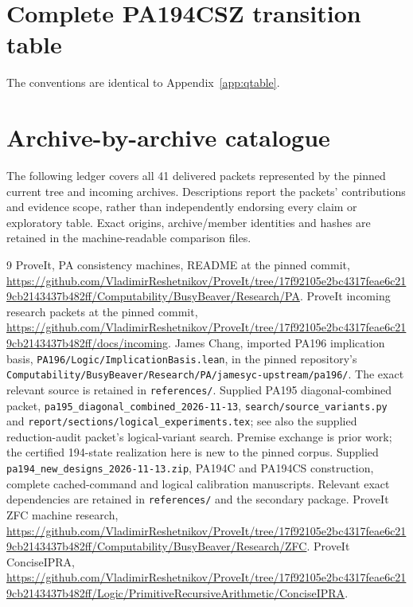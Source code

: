 \documentclass[11pt,letterpaper]{article}
\newcommand{\file}[1]{\texttt{\nolinkurl{#1}}}
\begin{document}
\clearpage
\section{Complete PA194CSZ transition table}\label{app:csztable}
The conventions are identical to Appendix~\ref{app:qtable}.


\clearpage
\section{Archive-by-archive catalogue}\label{app:ledger}
The following ledger covers all 41 delivered packets represented by the
pinned current tree and incoming archives. Descriptions report the packets'
contributions and evidence scope, rather than independently endorsing every
claim or exploratory table. Exact origins, archive/member identities and
hashes are retained in the machine-readable comparison files.


\begin{thebibliography}{9}
 ProveIt, PA consistency machines, README at the pinned
commit, \url{https://github.com/VladimirReshetnikov/ProveIt/tree/17f92105e2bc4317feae6c219cb2143437b482ff/Computability/BusyBeaver/Research/PA}.
 ProveIt incoming research packets at the pinned commit,
\url{https://github.com/VladimirReshetnikov/ProveIt/tree/17f92105e2bc4317feae6c219cb2143437b482ff/docs/incoming}.
 James Chang, imported PA196 implication basis,
\file{PA196/Logic/ImplicationBasis.lean}, in the pinned repository's
\file{Computability/BusyBeaver/Research/PA/jamesyc-upstream/pa196/}.
The exact relevant source is retained in \file{references/}.
 Supplied PA195 diagonal-combined packet,
\file{pa195_diagonal_combined_2026-11-13},
\file{search/source_variants.py} and
\file{report/sections/logical_experiments.tex}; see also the supplied
reduction-audit packet's logical-variant search. Premise exchange is prior
work; the certified 194-state realization here is new to the pinned corpus.
 Supplied \file{pa194_new_designs_2026-11-13.zip},
PA194C and PA194CS construction, complete cached-command and logical
calibration manuscripts. Relevant exact dependencies are retained in
\file{references/} and the secondary package.
 ProveIt ZFC machine research,
\url{https://github.com/VladimirReshetnikov/ProveIt/tree/17f92105e2bc4317feae6c219cb2143437b482ff/Computability/BusyBeaver/Research/ZFC}.
 ProveIt ConciseIPRA,
\url{https://github.com/VladimirReshetnikov/ProveIt/tree/17f92105e2bc4317feae6c219cb2143437b482ff/Logic/PrimitiveRecursiveArithmetic/ConciseIPRA}.
\end{thebibliography}
\end{document}
